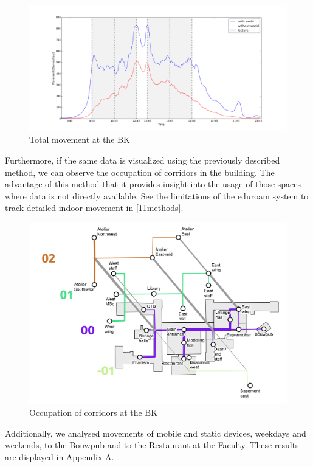 \begin{figure}[H]
\centering
\includegraphics[scale=0.35]{buildingpart_all_graph.png}
\captionsetup{justification=centering}
\caption{Total movement at the BK}
\label{figure:bk_total}
\end{figure}

Furthermore, if the same data is visualized using the previously described method, we can observe the occupation of corridors in the building. The advantage of this method that it provides insight into the usage of those spaces where data is not directly available. See the limitations of the
eduroam system to track detailed indoor movement in \autoref{11methods}.

\begin{figure}[H]
\centering
\includegraphics[scale=0.56]{bk_map_total.png}
\captionsetup{justification=centering}
\caption{Occupation of corridors at the BK}
\label{map:bk_total}
\end{figure}

Additionally, we analysed movements of mobile and static devices, weekdays and weekends, to the Bouwpub and to the Restaurant at the Faculty. These results are displayed in Appendix A.

